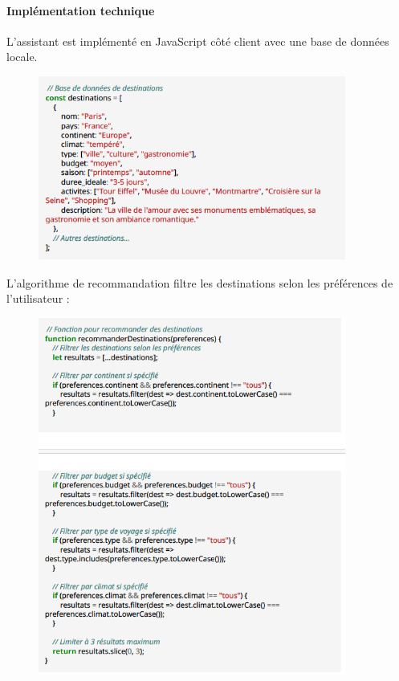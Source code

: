 \documentclass[a4paper,12pt]{article}
\begin{document}
\paragraph{Implémentation technique}
L’assistant est implémenté en JavaScript côté client avec une base de données locale.

\begin{figure}[H]
  \centering
  \includegraphics[width=0.9\textwidth]{capture6.png}
\end{figure}
L'algorithme de recommandation filtre les destinations selon les préférences de
l'utilisateur :
\begin{figure}[H]
  \centering
  \includegraphics[width=0.9\textwidth]{capture7.png}
\end{figure}
\end{document}
